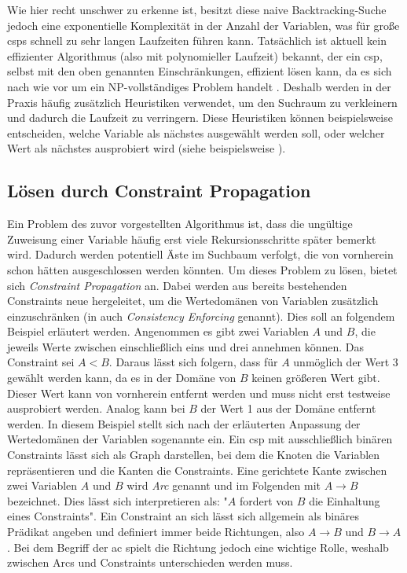 Wie hier recht unschwer zu erkenne ist, besitzt diese naive Backtracking-Suche jedoch eine exponentielle Komplexität in der Anzahl der Variablen,
was für große \acp*{csp} schnell zu sehr langen Laufzeiten führen kann. Tatsächlich ist aktuell kein effizienter Algorithmus (also mit polynomieller Laufzeit) bekannt, der ein
\ac*{csp}, selbst mit den oben genannten Einschränkungen, effizient lösen kann, da es sich nach wie vor um ein NP-vollständiges Problem handelt \cite{BestCSPSearch}. Deshalb
werden in der Praxis häufig zusätzlich Heuristiken verwendet, um den Suchraum zu verkleinern und dadurch die Laufzeit zu verringern. Diese Heuristiken können beispielsweise
entscheiden, welche Variable als nächstes ausgewählt werden soll, oder welcher Wert als nächstes ausprobiert wird (siehe beispielsweise \cite{OrderingHeuristics}).

\subsection{Lösen durch Constraint Propagation}
\label{sec:ConstrProp}
Ein Problem des zuvor vorgestellten Algorithmus ist, dass die ungültige Zuweisung einer Variable häufig erst viele Rekursionsschritte später bemerkt wird. Dadurch werden
potentiell Äste im Suchbaum verfolgt, die von vornherein schon hätten ausgeschlossen werden könnten. Um dieses Problem zu lösen, bietet sich \textit{Constraint Propagation}
an. Dabei werden aus bereits bestehenden Constraints neue hergeleitet, um die Wertedomänen von Variablen zusätzlich einzuschränken (in \cite{OrderingHeuristics} auch
\textit{Consistency Enforcing} genannt). Dies soll an folgendem Beispiel erläutert werden. Angenommen es gibt zwei Variablen $A$ und $B$, die jeweils Werte zwischen einschließlich
eins und drei annehmen können. Das Constraint sei $A < B$. Daraus lässt sich folgern, dass für $A$ unmöglich der Wert 3 gewählt werden kann, da es in der Domäne von $B$ keinen
größeren Wert gibt. Dieser Wert kann von vornherein entfernt werden und muss nicht erst testweise ausprobiert werden. Analog kann bei $B$ der Wert 1 aus der Domäne entfernt werden.
In diesem Beispiel stellt sich nach der erläuterten Anpassung der Wertedomänen der Variablen sogenannte  ein. Ein \ac*{csp} mit ausschließlich binären Constraints lässt 
sich als Graph darstellen, bei dem die Knoten die Variablen repräsentieren und die Kanten die Constraints. Eine gerichtete Kante zwischen zwei Variablen $A$ und $B$ wird 
\textit{Arc} genannt und im Folgenden mit $A \rightarrow B$ bezeichnet. Dies lässt sich interpretieren als: "$A$ fordert von $B$ die Einhaltung eines Constraints". Ein
Constraint an sich lässt sich allgemein als binäres Prädikat angeben und definiert immer beide Richtungen, also $A \rightarrow B$ und $B \rightarrow A$. Bei dem Begriff
der \acl*{ac} spielt die Richtung jedoch eine wichtige Rolle, weshalb zwischen Arcs und Constraints unterschieden werden muss.

